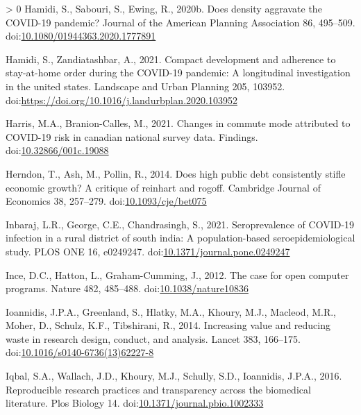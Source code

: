 \documentclass[]{elsarticle} %
\newlength{\cslhangindent}
\newenvironment{CSLReferences}[3] %
 {%
  \setlength{\parindent}{0pt}
  \ifodd #1 \everypar{\setlength{\hangindent}{\cslhangindent}}\ignorespaces\fi
  \ifnum #2 > 0
  \setlength{\parskip}{#2\baselineskip}
  \fi
 }%
 {}
\begin{document}
\begin{CSLReferences}{1}{0}
\leavevmode\hypertarget{ref-Hamidi2020density}{}%
Hamidi, S., Sabouri, S., Ewing, R., 2020b. Does density aggravate the
COVID-19 pandemic? Journal of the American Planning Association 86,
495--509.
doi:\href{https://doi.org/10.1080/01944363.2020.1777891}{10.1080/01944363.2020.1777891}

\leavevmode\hypertarget{ref-Hamidi2021compact}{}%
Hamidi, S., Zandiatashbar, A., 2021. Compact development and adherence
to stay-at-home order during the COVID-19 pandemic: A longitudinal
investigation in the united states. Landscape and Urban Planning 205,
103952. doi:\url{https://doi.org/10.1016/j.landurbplan.2020.103952}

\leavevmode\hypertarget{ref-Harris2021Changes}{}%
Harris, M.A., Branion-Calles, M., 2021. Changes in commute mode
attributed to COVID-19 risk in canadian national survey data. Findings.
doi:\href{https://doi.org/10.32866/001c.19088}{10.32866/001c.19088}

\leavevmode\hypertarget{ref-Herndon2014high}{}%
Herndon, T., Ash, M., Pollin, R., 2014. Does high public debt
consistently stifle economic growth? A critique of reinhart and rogoff.
Cambridge Journal of Economics 38, 257--279.
doi:\href{https://doi.org/10.1093/cje/bet075}{10.1093/cje/bet075}

\leavevmode\hypertarget{ref-Inbaraj2021seroprevalence}{}%
Inbaraj, L.R., George, C.E., Chandrasingh, S., 2021. Seroprevalence of
COVID-19 infection in a rural district of south india: A
population-based seroepidemiological study. PLOS ONE 16, e0249247.
doi:\href{https://doi.org/10.1371/journal.pone.0249247}{10.1371/journal.pone.0249247}

\leavevmode\hypertarget{ref-Ince2012case}{}%
Ince, D.C., Hatton, L., Graham-Cumming, J., 2012. The case for open
computer programs. Nature 482, 485--488.
doi:\href{https://doi.org/10.1038/nature10836}{10.1038/nature10836}

\leavevmode\hypertarget{ref-Ioannidis2014increasing}{}%
Ioannidis, J.P.A., Greenland, S., Hlatky, M.A., Khoury, M.J., Macleod,
M.R., Moher, D., Schulz, K.F., Tibshirani, R., 2014. Increasing value
and reducing waste in research design, conduct, and analysis. Lancet
383, 166--175.
doi:\href{https://doi.org/10.1016/s0140-6736(13)62227-8}{10.1016/s0140-6736(13)62227-8}

\leavevmode\hypertarget{ref-Iqbal2016reproducible}{}%
Iqbal, S.A., Wallach, J.D., Khoury, M.J., Schully, S.D., Ioannidis,
J.P.A., 2016. Reproducible research practices and transparency across
the biomedical literature. Plos Biology 14.
doi:\href{https://doi.org/10.1371/journal.pbio.1002333}{10.1371/journal.pbio.1002333}


\end{CSLReferences}
\end{document}
